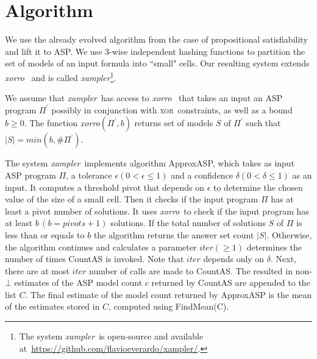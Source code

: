 \documentclass{svproc}
\newcommand{\XOR}{\textsc{xor}} %
\newcommand{\fff}{\ensuremath{\Pi}\xspace}
\newcommand{\ep}{$\epsilon$\xspace}
\newcommand{\del}{$\delta$\xspace}
\def\appasp{\normalfont \textsf{ApproxASP}\xspace}
\def\countas{\normalfont \textsf{CountAS}\xspace}
\newcommand{\sysfont}{\textit}
\newcommand{\xorro}{\sysfont{xorro}}
\newcommand{\xampler}{\sysfont{xampler}}
\begin{document}
\section{Algorithm} \label{approxasp}
We use the already evolved algorithm from the case of propositional satisfiability~\cite{ChakrabortyMV13} and lift it to ASP.
%
We use 3-wise independent hashing functions to partition the set of models of an input formula into ``small" cells.
%
Our resulting system extends \xorro~\cite{DBLP:conf/lpnmr/EverardoJKS19} and is called \xampler\footnote{The system \xampler\ is open-source and available at~\url{https://github.com/flavioeverardo/xampler/}.}.


We assume that \xampler\ has access to \xorro~\cite{DBLP:conf/lpnmr/EverardoJKS19} that takes an input an ASP program $\fff^{\prime}$ possibly in conjunction with \XOR\ constraints, as well as a bound $b\geq0$.
%
The function \xorro $(\fff^{\prime},b)$ returns set of models $S$ of $\fff^{\prime}$ such that $|S| = min(b, \#\fff^{\prime})$.
%

The system \xampler\ implements algorithm \appasp, which takes as input ASP program $\fff$, a tolerance \ep $(0 < \epsilon \leq 1)$ and a confidence \del $(0 < \delta \leq 1)$ as an input.
%
It computes a threshold pivot that depends on \ep to determine the chosen value of the size of a small cell.
%
Then it checks if the input program $\fff$ has at least a pivot number of solutions.
%
It uses \xorro\ to check if the input program has at least $b \, (b = pivots+ 1)$ solutions.
%
If the total number of solutions $S$ of $\fff$ is less than or equals to $b$ the algorithm returns the answer set count $|S|$. 
%
Otherwise, the algorithm continues and calculates a parameter $iter (\geq 1)$ determines the number of times \countas is invoked.
%
Note that $iter$ depends only on \del.
%
Next, there are at most $iter$ number of calls are made to \countas.
%
The resulted in non-$\bot$ estimates of the ASP model count $c$ returned by \countas are appended to the list $C$. 
%
The final estimate of the model count returned by \appasp is the mean of the estimates stored in $C$, computed using FindMean(C).
\end{document}
